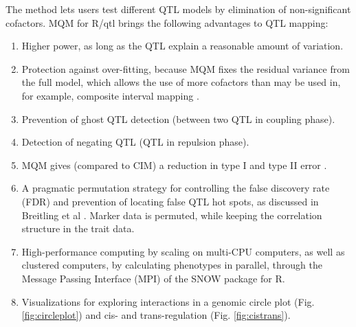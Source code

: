 The method lets users test different QTL models by elimination of non-significant cofactors. 
MQM for R/qtl brings the following advantages to QTL mapping:
\begin{enumerate}\itemsep1pt
\item Higher power, as long as the QTL explain a reasonable amount of variation.
\item Protection against over-fitting, because MQM fixes the residual variance from the full 
model, which allows the use of more cofactors than may be used in, for example, composite 
interval mapping \cite{Zeng:1994}.
\item Prevention of ghost QTL detection (between two QTL in coupling phase).
\item Detection of negating QTL (QTL in repulsion phase). 
\item MQM gives (compared to CIM) a reduction in type I and type II error \cite{Handbook:Jansen:2007}.
\item A pragmatic permutation strategy for controlling the false discovery rate (FDR) and 
prevention of locating false QTL hot spots, as discussed in Breitling et al \cite{Breitling:2008a}. 
Marker data is permuted, while keeping the correlation structure in the trait data.
\item High-performance computing by scaling on multi-CPU computers, as well as clustered 
computers, by calculating phenotypes in parallel, through the Message Passing Interface (MPI) of 
the SNOW package for R\cite{Tierney:2009}.
\item Visualizations for exploring interactions in a genomic circle plot (Fig. \ref{fig:circleplot}) and cis- 
and trans-regulation (Fig. \ref{fig:cistrans}).
\end{enumerate}

